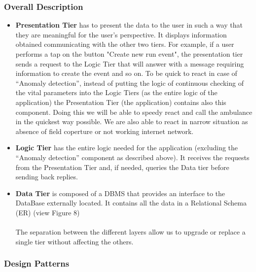 \documentclass[DD.tex]{subfiles}
\begin{document}
\subsubsection{Overall Description}
\begin{itemize}
	\item \textbf{Presentation Tier} has to present the data to the user in such a way that they are meaningful for the user's perspective. It displays information obtained communicating with the other two tiers. For example, if a user performs a tap on the button "Create new run event", the presentation tier sends a request to the Logic Tier that will answer with a message requiring information to create the event and so on.
		To be quick to react in case of “Anomaly detection”, instead of putting the logic of continuous checking of the vital parameters into the Logic Tiers (as the entire logic of the application) the Presentation Tier (the application) contains also this component. Doing this we will be able to speedy react and call the ambulance in the quickest way possible. We are also able to react in narrow situation as absence of field coperture or not working internet network.
	\item \textbf{Logic Tier} has the entire logic needed for the application (excluding the “Anomaly detection” component as described above). It receives the requests from the Presentation Tier and, if needed, queries the Data tier before sending back replies.
	\item \textbf{Data Tier} is composed of a DBMS that provides an interface to the DataBase externally located. It contains all the data in a Relational Schema (ER) (view Figure 8)\\\\
	The separation between the different layers allow us to upgrade or replace a single tier without affecting the others.
\end{itemize}
\subsubsection{Design Patterns}
\end{document}
